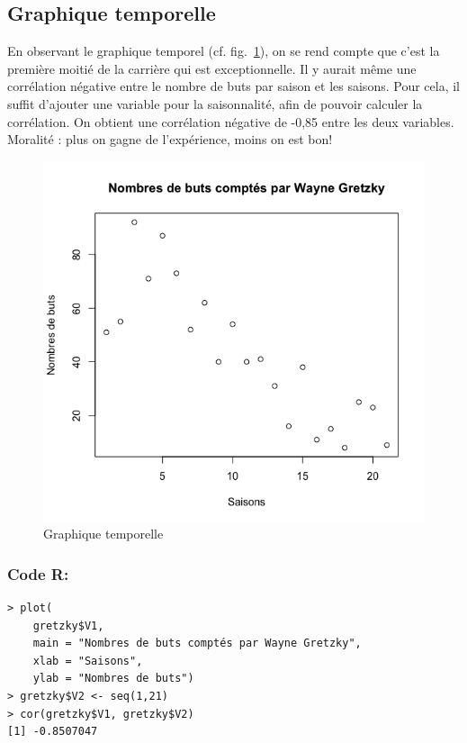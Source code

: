 \documentclass[10pt,twocolumn]{article}
\begin{document}
\subsection{Graphique temporelle}
En observant le graphique temporel (cf. fig.~\ref{gretzkyPlot}), on se rend compte que c’est la première moitié de la carrière qui est exceptionnelle. Il y aurait même une corrélation négative entre le nombre de buts par saison et les saisons. Pour cela, il suffit d’ajouter une variable pour la saisonnalité, afin de pouvoir calculer la corrélation. On obtient une corrélation négative de -0,85 entre les deux variables. Moralité : plus on gagne de l’expérience, moins on est bon!

\begin{figure}[htbp]
	\caption{Graphique temporelle}
	\label{gretzkyPlot}
	\centering
	\includegraphics[width=\linewidth]{d1_gretzkyPlot}
\end{figure}

\subsubsection*{Code R:}
\begin{verbatim}
> plot(
    gretzky$V1,
    main = "Nombres de buts comptés par Wayne Gretzky",
    xlab = "Saisons",
    ylab = "Nombres de buts")
> gretzky$V2 <- seq(1,21)
> cor(gretzky$V1, gretzky$V2)
[1] -0.8507047
\end{verbatim}





\end{document}
